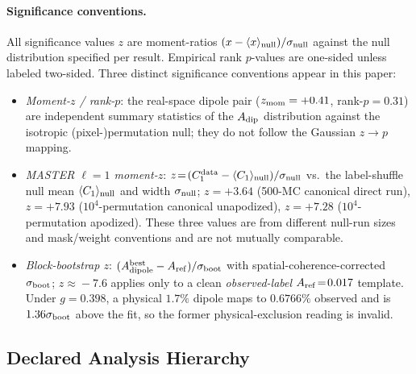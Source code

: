 \documentclass[aps,prd,twocolumn,superscriptaddress,preprintnumbers,nofootinbib,longbibliography,floatfix]{revtex4-2}
\begin{document}
\paragraph{Significance conventions.}
All significance values $z$ are moment-ratios $(x - \langle x\rangle_{\rm null})/\sigma_{\rm null}$ against the null distribution specified per result. Empirical rank $p$-values are one-sided unless labeled two-sided. Three distinct significance conventions appear in this paper:
\begin{itemize}\setlength{\itemsep}{0pt}
\item \emph{Moment-$z$ / rank-$p$}: the real-space dipole pair ($z_{\rm mom}=+0.41$, rank-$p=0.31$) are independent summary statistics of the $A_{\rm dip}$ distribution against the isotropic (pixel-)permutation null; they do not follow the Gaussian $z\!\to\!p$ mapping.
\item \emph{MASTER $\ell\!=\!1$ moment-$z$}: $z\!=\!(C_1^{\rm data}-\langle C_1\rangle_{\rm null})/\sigma_{\rm null}$ vs.\ the label-shuffle null mean $\langle C_1\rangle_{\rm null}$ and width $\sigma_{\rm null}$; $z=+3.64$ (500-MC canonical direct run), $z=+7.93$ ($10^4$-permutation canonical unapodized), $z=+7.28$ ($10^4$-permutation apodized). These three values are from different null-run sizes and mask/weight conventions and are not mutually comparable.
\item \emph{Block-bootstrap $z$}: $(A_{\rm dipole}^{\rm best} - A_{\rm ref})/\sigma_{\rm boot}$ with spatial-coherence-corrected $\sigma_{\rm boot}$; $z\!\approx\!-7.6$ applies only to a clean \emph{observed-label} $A_{\rm ref}\!=\!0.017$ template. Under $g=0.398$, a physical $1.7\%$ dipole maps to $0.6766\%$ observed and is $1.36\sigma_{\rm boot}$ above the fit, so the former physical-exclusion reading is invalid.
\end{itemize}

\subsection{Declared Analysis Hierarchy}
\label{sec:prereg}
\end{document}
